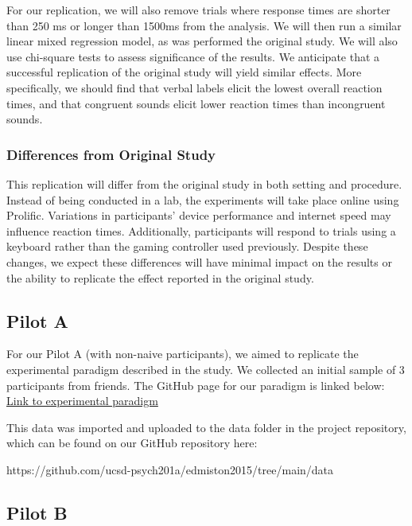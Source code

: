 \documentclass[
  letterpaper,
  DIV=11,
  numbers=noendperiod]{scrartcl}
\begin{document}
For our replication, we will also remove trials where response times are
shorter than 250 ms or longer than 1500ms from the analysis. We will
then run a similar linear mixed regression model, as was performed the
original study. We will also use chi-square tests to assess significance
of the results. We anticipate that a successful replication of the
original study will yield similar effects. More specifically, we should
find that verbal labels elicit the lowest overall reaction times, and
that congruent sounds elicit lower reaction times than incongruent
sounds.

\subsubsection{Differences from Original
Study}\label{differences-from-original-study}

This replication will differ from the original study in both setting and
procedure. Instead of being conducted in a lab, the experiments will
take place online using Prolific. Variations in participants' device
performance and internet speed may influence reaction times.
Additionally, participants will respond to trials using a keyboard
rather than the gaming controller used previously. Despite these
changes, we expect these differences will have minimal impact on the
results or the ability to replicate the effect reported in the original
study.

\subsection{Pilot A}\label{pilot-a}

For our Pilot A (with non-naive participants), we aimed to replicate the
experimental paradigm described in the study. We collected an initial
sample of 3 participants from friends. The GitHub page for our paradigm
is linked below:
\href{https://ucsd-psych201a.github.io/edmiston2015/}{Link to
experimental paradigm}

This data was imported and uploaded to the data folder in the project
repository, which can be found on our GitHub repository here:

https://github.com/ucsd-psych201a/edmiston2015/tree/main/data

\subsection{Pilot B}\label{pilot-b}
\end{document}
